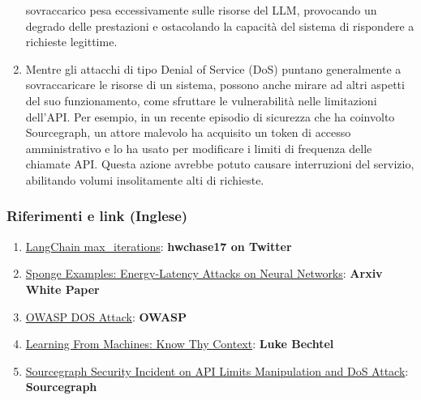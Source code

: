 \documentclass[
]{article}
\providecommand{\tightlist}{%
  \setlength{\itemsep}{0pt}\setlength{\parskip}{0pt}}
\begin{document}
\begin{enumerate}
  sovraccarico pesa eccessivamente sulle risorse del LLM, provocando un
  degrado delle prestazioni e ostacolando la capacità del sistema di
  rispondere a richieste legittime.
\item
  Mentre gli attacchi di tipo Denial of Service (DoS) puntano
  generalmente a sovraccaricare le risorse di un sistema, possono anche
  mirare ad altri aspetti del suo funzionamento, come sfruttare le
  vulnerabilità nelle limitazioni dell'API. Per esempio, in un recente
  episodio di sicurezza che ha coinvolto Sourcegraph, un attore malevolo
  ha acquisito un token di accesso amministrativo e lo ha usato per
  modificare i limiti di frequenza delle chiamate API. Questa azione
  avrebbe potuto causare interruzioni del servizio, abilitando volumi
  insolitamente alti di richieste.
\end{enumerate}

\subsubsection{Riferimenti e link
(Inglese)}\label{riferimenti-e-link-inglese}

\begin{enumerate}
\def\labelenumi{\arabic{enumi}.}
\tightlist
\item
  \href{https://twitter.com/hwchase17/status/1608467493877579777}{LangChain
  max\_iterations}: \textbf{hwchase17 on Twitter}
\item
  \href{https://arxiv.org/abs/2006.03463}{Sponge Examples:
  Energy-Latency Attacks on Neural Networks}: \textbf{Arxiv White Paper}
\item
  \href{https://owasp.org/www-community/attacks/Denial_of_Service}{OWASP
  DOS Attack}: \textbf{OWASP}
\item
  \href{https://lukebechtel.com/blog/lfm-know-thy-context}{Learning From
  Machines: Know Thy Context}: \textbf{Luke Bechtel}
\item
  \href{https://about.sourcegraph.com/blog/security-update-august-2023}{Sourcegraph
  Security Incident on API Limits Manipulation and DoS Attack}:
  \textbf{Sourcegraph}
\end{enumerate}
\end{document}
